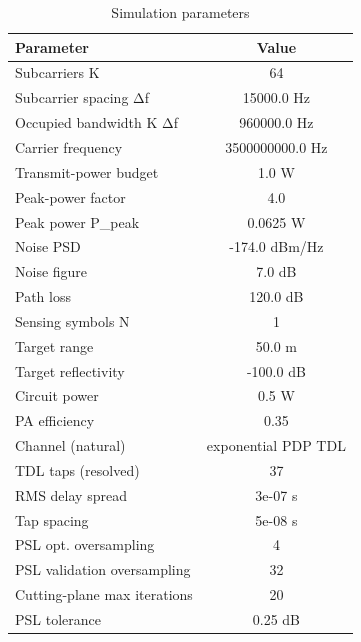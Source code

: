 \begin{table}[t]
\centering
\caption{Simulation parameters}
\label{tab:params}
\begin{tabular}{lc}
\hline
Parameter & Value \\
\hline
Subcarriers K & 64 \\
Subcarrier spacing Δf & 15000.0 Hz \\
Occupied bandwidth K Δf & 960000.0 Hz \\
Carrier frequency & 3500000000.0 Hz \\
Transmit-power budget & 1.0 W \\
Peak-power factor & 4.0 \\
Peak power P_peak & 0.0625 W \\
Noise PSD & -174.0 dBm/Hz \\
Noise figure & 7.0 dB \\
Path loss & 120.0 dB \\
Sensing symbols N & 1 \\
Target range & 50.0 m \\
Target reflectivity & -100.0 dB \\
Circuit power & 0.5 W \\
PA efficiency & 0.35 \\
Channel (natural) & exponential PDP TDL \\
TDL taps (resolved) & 37 \\
RMS delay spread & 3e-07 s \\
Tap spacing & 5e-08 s \\
PSL opt. oversampling & 4 \\
PSL validation oversampling & 32 \\
Cutting-plane max iterations & 20 \\
PSL tolerance & 0.25 dB \\
\hline
\end{tabular}
\end{table}
